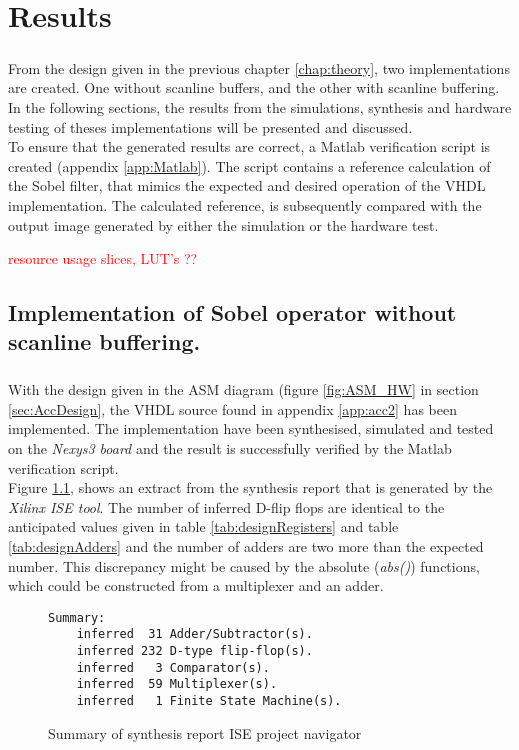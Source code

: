 \chapter{Results}
\label{chap:Results}
\paragraph*{}
From the design given in the previous chapter \ref{chap:theory}, two implementations are created. One without scanline buffers, and the other with scanline buffering. In the following sections, the results from the simulations, synthesis and hardware testing of theses implementations will be presented and discussed. \\
To ensure that the generated results are correct, a Matlab verification script is created (appendix \ref{app:Matlab}). The script contains a reference calculation of the Sobel filter, that mimics the expected and desired operation of the VHDL implementation.
The calculated reference, is subsequently compared with the output image generated by either the simulation or the hardware test.

\textcolor{red}{resource usage slices, LUT's ??}
\section{Implementation of Sobel operator without scanline buffering.}
\paragraph*{}
With the design given in the ASM diagram (figure \ref{fig:ASM_HW} in section \ref{sec:AccDesign}, the VHDL source found in appendix \ref{app:acc2} has been implemented. The implementation have been synthesised, simulated and tested on the \textit{Nexys3 board} and the result is successfully verified by the Matlab verification script.\\
Figure \ref{fig:sum_synthesis_report}, shows an extract from the synthesis report that is generated by the \textit{Xilinx  ISE tool}. The number of inferred D-flip flops are identical to the anticipated values given in table  \ref{tab:designRegisters} and table \ref{tab:designAdders} and the number of adders are two more than the expected number. This discrepancy might be caused by the absolute (\textit{abs()}) functions, which could be constructed from a multiplexer and an adder. 

\begin{figure}[H]
\centering
\small
\begin{BVerbatim}
Summary:
    inferred  31 Adder/Subtractor(s).
    inferred 232 D-type flip-flop(s).
    inferred   3 Comparator(s).
    inferred  59 Multiplexer(s).
    inferred   1 Finite State Machine(s).
\end{BVerbatim}
\caption{Summary of synthesis report ISE project navigator}
\label{fig:sum_synthesis_report}
\end{figure}

